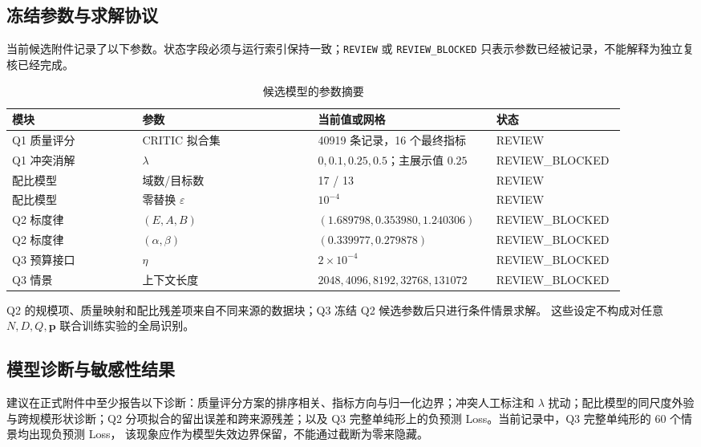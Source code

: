 \subsection{冻结参数与求解协议}
\label{app:frozen-parameters}

当前候选附件记录了以下参数。状态字段必须与运行索引保持一致；\texttt{REVIEW} 或
\texttt{REVIEW\_BLOCKED} 只表示参数已经被记录，不能解释为独立复核已经完成。

\begin{table}[htbp]
\centering
\caption{候选模型的参数摘要}
\label{tab:app-parameters}
\small
\begin{tabular}{p{0.20\linewidth}p{0.27\linewidth}p{0.27\linewidth}p{0.15\linewidth}}
\toprule
模块 & 参数 & 当前值或网格 & 状态 \\
\midrule
Q1 质量评分 & CRITIC 拟合集 & 40919 条记录，16 个最终指标 & REVIEW \\
Q1 冲突消解 & $\lambda$ & $0,0.1,0.25,0.5$；主展示值 $0.25$ & REVIEW\_BLOCKED \\
配比模型 & 域数/目标数 & 17 / 13 & REVIEW \\
配比模型 & 零替换 $\varepsilon$ & $10^{-4}$ & REVIEW \\
Q2 标度律 & $(E,A,B)$ & $(1.689798,0.353980,1.240306)$ & REVIEW\_BLOCKED \\
Q2 标度律 & $(\alpha,\beta)$ & $(0.339977,0.279878)$ & REVIEW\_BLOCKED \\
Q3 预算接口 & $\eta$ & $2\times10^{-4}$ & REVIEW\_BLOCKED \\
Q3 情景 & 上下文长度 & $2048,4096,8192,32768,131072$ & REVIEW\_BLOCKED \\
\bottomrule
\end{tabular}
\end{table}

Q2 的规模项、质量映射和配比残差项来自不同来源的数据块；Q3 冻结 Q2 候选参数后只进行条件情景求解。
这些设定不构成对任意 $N,D,Q,\boldsymbol p$ 联合训练实验的全局识别。

\subsection{模型诊断与敏感性结果}
\label{app-diagnostics}

建议在正式附件中至少报告以下诊断：质量评分方案的排序相关、指标方向与归一化边界；冲突人工标注和
$\lambda$ 扰动；配比模型的同尺度外验与跨规模形状诊断；Q2 分项拟合的留出误差和跨来源残差；以及
Q3 完整单纯形上的负预测 Loss。当前记录中，Q3 完整单纯形的 60 个情景均出现负预测 Loss，
该现象应作为模型失效边界保留，不能通过截断为零来隐藏。

